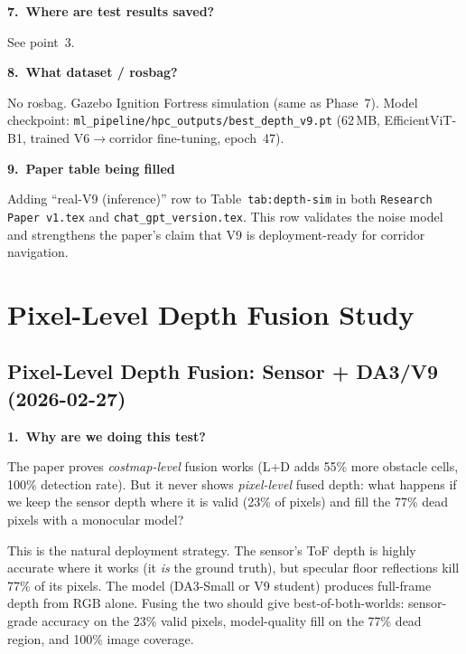 \documentclass[11pt,a4paper]{article}
\begin{document}
\textbf{7.\ Where are test results saved?}

See point~3.

\textbf{8.\ What dataset / rosbag?}

No rosbag.  Gazebo Ignition Fortress simulation (same as Phase~7).
Model checkpoint: \texttt{ml\_pipeline/hpc\_outputs/best\_depth\_v9.pt}
(62\,MB, EfficientViT-B1, trained V6$\to$corridor fine-tuning, epoch~47).

\textbf{9.\ Paper table being filled}

Adding ``real-V9 (inference)'' row to Table~\texttt{tab:depth-sim} in
both \texttt{Research Paper v1.tex} and
\texttt{chat\_gpt\_version.tex}.  This row validates the noise model
and strengthens the paper's claim that V9 is deployment-ready for
corridor navigation.


\section*{Pixel-Level Depth Fusion Study}

\subsection*{Pixel-Level Depth Fusion: Sensor + DA3/V9 (2026-02-27)}

\textbf{1.\ Why are we doing this test?}

The paper proves \emph{costmap-level} fusion works (L+D adds 55\%
more obstacle cells, 100\% detection rate).  But it never shows
\emph{pixel-level} fused depth: what happens if we keep the sensor
depth where it is valid (23\% of pixels) and fill the 77\% dead pixels
with a monocular model?

This is the natural deployment strategy.  The sensor's ToF depth is
highly accurate where it works (it \emph{is} the ground truth), but
specular floor reflections kill 77\% of its pixels.  The model
(DA3-Small or V9 student) produces full-frame depth from RGB alone.
Fusing the two should give best-of-both-worlds: sensor-grade accuracy
on the 23\% valid pixels, model-quality fill on the 77\% dead region,
and 100\% image coverage.
\end{document}
